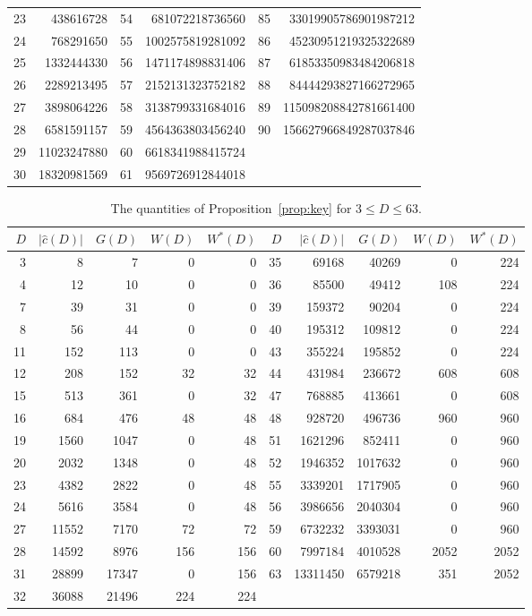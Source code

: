 \documentclass[11pt]{amsart}
\theoremstyle{definition}
\begin{document}
\begin{table}[H]
\begin{tabular}{@{}rr@{\qquad}rr@{\qquad}rr@{}}
23 & 438616728 & 54 & 681072218736560 & 85 & 33019905786901987212\\
24 & 768291650 & 55 & 1002575819281092 & 86 & 45230951219325322689\\
25 & 1332444330 & 56 & 1471174898831406 & 87 & 61853350983484206818\\
26 & 2289213495 & 57 & 2152131323752182 & 88 & 84444293827166272965\\
27 & 3898064226 & 58 & 3138799331684016 & 89 & 115098208842781661400\\
28 & 6581591157 & 59 & 4564363803456240 & 90 & 156627966849287037846\\
29 & 11023247880 & 60 & 6618341988415724 &  & \\
30 & 18320981569 & 61 & 9569726912844018 &  & \\
\bottomrule\end{tabular}\end{table}
\begin{table}[H]\centering\footnotesize
\caption{The quantities of Proposition~\ref{prop:key} for $3\le D\le 63$.}\label{tab:key}
\begin{tabular}{@{}rrrrr@{\qquad}rrrrr@{}}\toprule
$D$ & $|\hat c(D)|$ & $G(D)$ & $W(D)$ & $W^*(D)$ & $D$ & $|\hat c(D)|$ & $G(D)$ & $W(D)$ & $W^*(D)$\\\midrule
3 & 8 & 7 & 0 & 0 & 35 & 69168 & 40269 & 0 & 224\\
4 & 12 & 10 & 0 & 0 & 36 & 85500 & 49412 & 108 & 224\\
7 & 39 & 31 & 0 & 0 & 39 & 159372 & 90204 & 0 & 224\\
8 & 56 & 44 & 0 & 0 & 40 & 195312 & 109812 & 0 & 224\\
11 & 152 & 113 & 0 & 0 & 43 & 355224 & 195852 & 0 & 224\\
12 & 208 & 152 & 32 & 32 & 44 & 431984 & 236672 & 608 & 608\\
15 & 513 & 361 & 0 & 32 & 47 & 768885 & 413661 & 0 & 608\\
16 & 684 & 476 & 48 & 48 & 48 & 928720 & 496736 & 960 & 960\\
19 & 1560 & 1047 & 0 & 48 & 51 & 1621296 & 852411 & 0 & 960\\
20 & 2032 & 1348 & 0 & 48 & 52 & 1946352 & 1017632 & 0 & 960\\
23 & 4382 & 2822 & 0 & 48 & 55 & 3339201 & 1717905 & 0 & 960\\
24 & 5616 & 3584 & 0 & 48 & 56 & 3986656 & 2040304 & 0 & 960\\
27 & 11552 & 7170 & 72 & 72 & 59 & 6732232 & 3393031 & 0 & 960\\
28 & 14592 & 8976 & 156 & 156 & 60 & 7997184 & 4010528 & 2052 & 2052\\
31 & 28899 & 17347 & 0 & 156 & 63 & 13311450 & 6579218 & 351 & 2052\\
32 & 36088 & 21496 & 224 & 224 &  & & & & \\
\bottomrule\end{tabular}\end{table}
\end{document}
